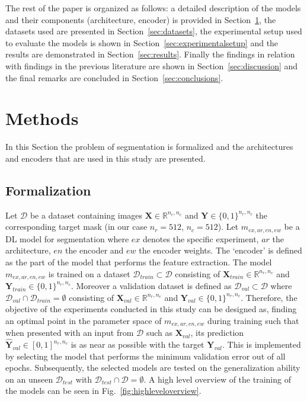 \documentclass{elsarticle}
\begin{document}
The rest of the paper is organized as follows: a detailed description of the models and their components (architecture, encoder) is provided in Section~\ref{sec:methods}, the datasets used are presented in Section~\ref{sec:datasets}, the experimental setup used to evaluate the models is shown in Section~\ref{sec:experimentalsetup} and the results are demonstrated in Section~\ref{sec:results}. Finally the findings in relation with findings in the previous literature are shown in Section~\ref{sec:discussion} and the final remarks are concluded in Section~\ref{sec:conclusions}.

\section{Methods}\label{sec:methods}
In this Section the problem of segmentation is formalized and the architectures and encoders that are used in this study are presented.

\subsection{Formalization}
Let $\mathcal{D}$ be a dataset containing images $\bm{X} \in \mathbb{R}^{n_r, n_c}$ and $\bm{Y} \in \{0, 1\}^{n_r, n_c}$ the corresponding target mask (in our case $n_r=512$, $n_c=512$).
Let $m_{ex, ar, en, ew}$ be a DL model for segmentation where $ex$ denotes the specific experiment, $ar$ the architecture, $en$ the encoder and $ew$ the encoder weights.
The `encoder' is defined as the part of the model that performs the feature extraction.
The model $m_{ex, ar, en, ew}$ is trained on a dataset $\mathcal{D}_{train}\subset\mathcal{D}$ consisting of $\bm{X}_{train} \in \mathbb{R}^{n_r, n_c}$ and $\bm{Y}_{train} \in \{0, 1\}^{n_r, n_c}$.
Moreover a validation dataset is defined as $\mathcal{D}_{val}\subset\mathcal{D}$ where $\mathcal{D}_{val}\cap\mathcal{D}_{train}=\emptyset$ consisting of $\bm{X}_{val} \in \mathbb{R}^{n_r, n_c}$ and $\bm{Y}_{val} \in \{0, 1\}^{n_r, n_c}$.
Therefore, the objective of the experiments conducted in this study can be designed as, finding an optimal point in the parameter space of $m_{ex, ar, en, ew}$ during training such that when presented with an input from $\mathcal{D}$ such as $\bm{X}_{val}$, its prediction $\hat{\bm{Y}}_{val} \in [0, 1]^{n_r, n_c}$ is as near as possible with the target $\bm{Y}_{val}$.
This is implemented by selecting the model that performs the minimum validation error out of all epochs.
Subsequently, the selected models are tested on the generalization ability on an unseen $\mathcal{D}_{test}$ with $\mathcal{D}_{test}\cap\mathcal{D}=\emptyset$.
A high level overview of the training of the models can be seen in Fig.~\ref{fig:highleveloverview}.
\end{document}
